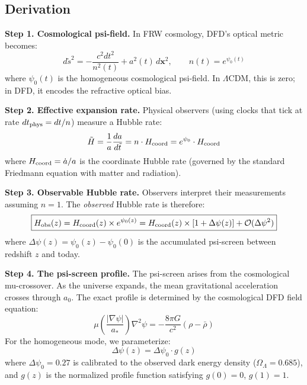 \documentclass[11pt,a4paper]{article}
\newcommand{\LCDM}{$\Lambda$CDM}
\begin{document}
\begin{tcolorbox}[colback=blue!3!white, colframe=blue!60!black,
  title=\textbf{Finding \thesection: The Exact Modified $H(z)$
  Equation}\label{find:background}]

\subsection*{Derivation}

\textbf{Step 1. Cosmological psi-field.} In FRW cosmology, DFD's
optical metric becomes:
\begin{equation}
d\tilde{s}^2 = -\frac{c^2 dt^2}{n^2(t)} + a^2(t)\,d\mathbf{x}^2,
\qquad n(t) = e^{\psi_0(t)}
\end{equation}
where $\psi_0(t)$ is the homogeneous cosmological psi-field. In \LCDM,
this is zero; in DFD, it encodes the refractive optical bias.

\textbf{Step 2. Effective expansion rate.} Physical observers (using
clocks that tick at rate $dt_{\rm phys} = dt/n$) measure a Hubble rate:
\begin{equation}
\tilde{H} = \frac{1}{a}\frac{da}{d\tilde{t}} = n \cdot H_{\rm coord}
= e^{\psi_0} \cdot H_{\rm coord}
\end{equation}
where $H_{\rm coord} = \dot{a}/a$ is the coordinate Hubble rate
(governed by the standard Friedmann equation with matter and radiation).

\textbf{Step 3. Observable Hubble rate.} Observers interpret their
measurements assuming $n = 1$. The \emph{observed} Hubble rate is
therefore:
\begin{equation}
\boxed{
H_{\rm obs}(z) = H_{\rm coord}(z) \times e^{\psi_0(z)}
= H_{\rm coord}(z) \times \left[1 + \Delta\psi(z)\right]
+ \mathcal{O}(\Delta\psi^2)
}
\label{eq:H_modified}
\end{equation}
where $\Delta\psi(z) = \psi_0(z) - \psi_0(0)$ is the accumulated
psi-screen between redshift $z$ and today.

\textbf{Step 4. The psi-screen profile.} The psi-screen arises from
the cosmological mu-crossover. As the universe expands, the mean
gravitational acceleration crosses through $a_0$. The exact profile
is determined by the cosmological DFD field equation:
\begin{equation}
\mu\!\left(\frac{|\nabla\psi|}{a_*}\right)\nabla^2\psi
= -\frac{8\pi G}{c^2}(\rho - \bar{\rho})
\label{eq:cosmo_field}
\end{equation}
For the homogeneous mode, we parameterize:
\begin{equation}
\Delta\psi(z) = \Delta\psi_0 \cdot g(z)
\label{eq:psi_profile}
\end{equation}
where $\Delta\psi_0 = 0.27$ is calibrated to the observed dark energy
density ($\Omega_\Lambda = 0.685$), and $g(z)$ is the normalized
profile function satisfying $g(0) = 0$, $g(1) = 1$.


\end{tcolorbox}
\end{document}
